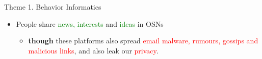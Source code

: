 \documentclass[
 size=14pt,
 paper=smartboard,  %
 mode=present, 		%
 display=slides, 	%
 style=tuliplab,  	%
 pauseslide,
 fleqn,leqno]{powerdot}
\begin{document}
\begin{slide}{Theme 1. Behavior Informatics}
\begin{itemize}
\item
People share \textcolor{green}{news, interests}
and \textcolor{green}{ideas} in OSNs

\begin{itemize}
\item
\textbf{though} these platforms also spread
\textcolor{red}{email malware, rumours, gossips}
\textcolor{red}{and malicious links}, and also leak our
\textcolor{red}{privacy}.
\end{itemize}
\end{itemize}

\end{slide}
\end{document}
